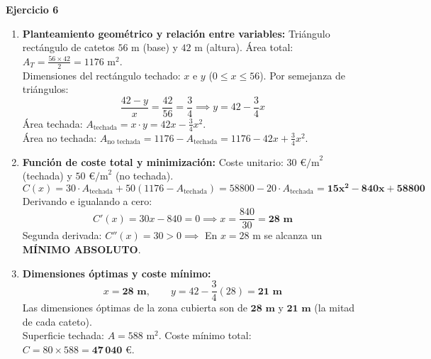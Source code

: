 \documentclass[11pt,a4paper]{article}
\begin{document}
\noindent\textbf{Ejercicio 6}
\begin{enumerate}[label=\textbf{\alph*)}, leftmargin=2em, itemsep=6pt]
    \item \textbf{Planteamiento geométrico y relación entre variables:}
    Triángulo rectángulo de catetos $56\text{ m}$ (base) y $42\text{ m}$ (altura). Área total: $A_T = \frac{56 \times 42}{2} = 1176\text{ m}^2$.\\
    Dimensiones del rectángulo techado: $x$ e $y$ ($0 \le x \le 56$). Por semejanza de triángulos:
    \[
    \frac{42 - y}{x} = \frac{42}{56} = \frac{3}{4} \implies y = 42 - \frac{3}{4}x
    \]
    Área techada: $A_{\text{techada}} = x \cdot y = 42x - \frac{3}{4}x^2$.\\
    Área no techada: $A_{\text{no techada}} = 1176 - A_{\text{techada}} = 1176 - 42x + \frac{3}{4}x^2$.
    \item \textbf{Función de coste total y minimización:}
    Coste unitario: $30\text{ €/m}^2$ (techada) y $50\text{ €/m}^2$ (no techada).
    \[
    C(x) = 30 \cdot A_{\text{techada}} + 50(1176 - A_{\text{techada}}) = 58800 - 20 \cdot A_{\text{techada}} = \mathbf{15x^2 - 840x + 58800}
    \]
    Derivando e igualando a cero:
    \[
    C'(x) = 30x - 840 = 0 \implies x = \frac{840}{30} = \mathbf{28\text{ m}}
    \]
    Segunda derivada: $C''(x) = 30 > 0 \implies$ En $x = 28\text{ m}$ se alcanza un \textbf{MÍNIMO ABSOLUTO}.
    \item \textbf{Dimensiones óptimas y coste mínimo:}
    \[
    x = \mathbf{28\text{ m}}, \qquad y = 42 - \frac{3}{4}(28) = \mathbf{21\text{ m}}
    \]
    Las dimensiones óptimas de la zona cubierta son de $\mathbf{28\text{ m}}$ y $\mathbf{21\text{ m}}$ (la mitad de cada cateto).\\
    Superficie techada: $A = 588\text{ m}^2$. Coste mínimo total: $C = 80 \times 588 = \mathbf{47\,040\text{ €}}$.
\end{enumerate}
\end{document}
